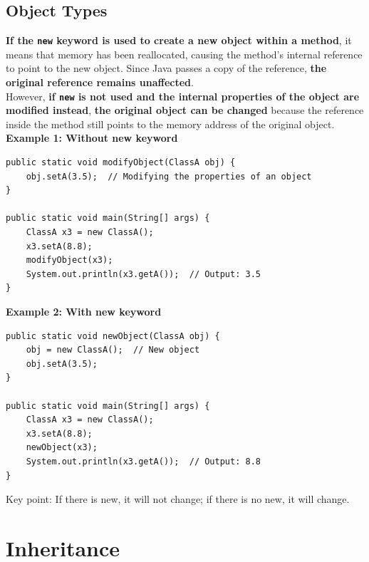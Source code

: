 \documentclass[letterpaper,12pt]{article}
\begin{document}
\subsection{Object Types}
\textbf{If the \texttt{new} keyword is used to create a new object within a method}, it means that memory has been reallocated, causing the method's internal reference to point to the new object. Since Java passes a copy of the reference, \textbf{the original reference remains unaffected}.\\
However, \textbf{if \texttt{new} is not used and the internal properties of the object are modified instead}, \textbf{the original object can be changed} because the reference inside the method still points to the memory address of the original object.\\
\textbf{Example 1: Without new keyword}
\begin{verbatim}
public static void modifyObject(ClassA obj) {
    obj.setA(3.5);  // Modifying the properties of an object
}

public static void main(String[] args) {
    ClassA x3 = new ClassA();
    x3.setA(8.8);
    modifyObject(x3);
    System.out.println(x3.getA());  // Output: 3.5
}
\end{verbatim}
\textbf{Example 2: With new keyword}
\begin{verbatim}
public static void newObject(ClassA obj) {
    obj = new ClassA();  // New object
    obj.setA(3.5);
}

public static void main(String[] args) {
    ClassA x3 = new ClassA();
    x3.setA(8.8);
    newObject(x3);
    System.out.println(x3.getA());  // Output: 8.8
}
\end{verbatim}
Key point: If there is new, it will not change; if there is no new, it will change.

\section{Inheritance}
\end{document}
